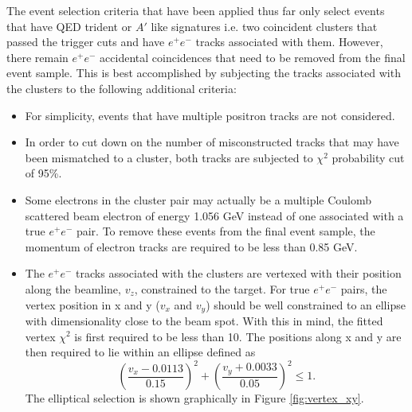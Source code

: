 The event selection criteria that have been applied thus far only select 
events that have QED trident or $A'$ like signatures i.e. two coincident clusters that
passed the trigger cuts and have $e^+e^-$ tracks associated with them.  However, 
there remain $e^+e^-$ accidental coincidences that need to be removed from the final 
event sample.  This is best accomplished by subjecting the tracks associated 
with the clusters to the following additional criteria:
\begin{itemize}
    \item For simplicity, events that have multiple positron tracks are not 
          considered.
    \item In order to cut down on the number of misconstructed tracks that may
          have been mismatched to a cluster, both tracks are subjected to 
          $\chi^2$ probability cut of 95\%.
    \item Some electrons in the cluster pair may actually be a multiple
          Coulomb scattered beam electron of energy 1.056 GeV 
          instead of one associated with a true $e^+e^-$ 
          pair.  To remove these events from the final event sample, the 
          momentum of electron tracks are required to be less than 0.85 GeV.
    \item The $e^+e^-$ tracks associated with the clusters are vertexed with 
          their position along the beamline, $v_z$, constrained to the target. 
          For true $e^+e^-$ pairs, the vertex position in x and y ($v_x$ and $v_y$) should be
          well constrained to an ellipse with dimensionality close to the beam 
          spot.  With this in mind, the fitted vertex $\chi^2$ is first required 
          to be less than 10.  The positions along x and y are then required 
          to lie within an ellipse 
          defined as
          \[
          \left (\frac{v_x - 0.0113}{0.15} \right)^2 + \left(\frac{v_y + 0.0033}{0.05} \right)^2  \le 1.
          \]
          The elliptical selection is shown graphically in Figure \ref{fig:vertex_xy}.
\end{itemize}

